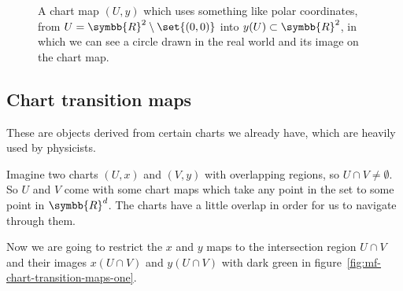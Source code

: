 \begin{figure}[ht]
  \caption{A chart map $(U,y)$ which uses something like polar coordinates, from
    $U=\symbb{R}^2\setminus\set{(0,0)}$ into $y(U)\subset\symbb{R}^2$, in which we can see a
    circle drawn in the real world and its image on the chart map.}
  \label{fig:mf-polar-chart-map-example}
\end{figure}

\subsection{Chart transition maps}
These are objects derived from certain charts we already have, which are heavily used by
physicists.

Imagine two charts $(U,x)$ and $(V,y)$ with overlapping regions, so $U\cap V \neq\emptyset$.
So $U$ and $V$ come with some chart maps which take any point in the set to some point in
$\symbb{R}^d$. The charts have a little overlap in order for us to navigate through them.

Now we are going to restrict the $x$ and $y$ maps to the intersection region $U\cap V$
and their images $x(U\cap V)$ and $y(U\cap V)$ with dark green in
figure~\ref{fig:mf-chart-transition-maps-one}.

